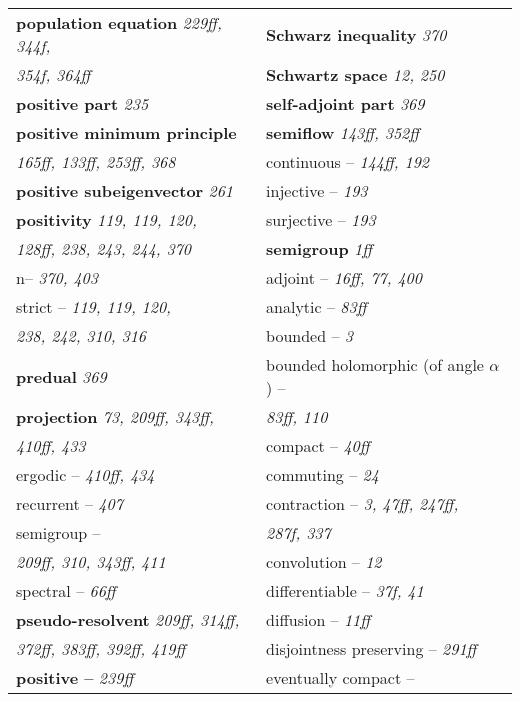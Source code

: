 \begin{longtable}{p{}p{}}
\textbf{population equation} \textit{229ff, 344f,} & \textbf{Schwarz inequality} \textit{370} \\
\quad \textit{354f, 364ff} & \textbf{Schwartz space} \textit{12, 250} \\
\textbf{positive part} \textit{235} & \textbf{self-adjoint part} \textit{369} \\
\textbf{positive minimum principle} & \textbf{semiflow} \textit{143ff, 352ff} \\
\quad \textit{165ff, 133ff, 253ff, 368} & \quad continuous -- \textit{144ff, 192} \\
\textbf{positive subeigenvector} \textit{261} & \quad injective -- \textit{193} \\
\textbf{positivity} \textit{119, 119, 120,} & \quad surjective -- \textit{193} \\
\quad \textit{128ff, 238, 243, 244, 370} & \textbf{semigroup} \textit{1ff} \\
\quad n-- \textit{370, 403} & \quad adjoint -- \textit{16ff, 77, 400} \\
\quad strict -- \textit{119, 119, 120,} & \quad analytic -- \textit{83ff} \\
\quad\quad \textit{238, 242, 310, 316} & \quad bounded -- \textit{3} \\
\textbf{predual} \textit{369} & \quad bounded holomorphic (of angle $ \alpha $) -- \\
\textbf{projection} \textit{73, 209ff, 343ff,} & \quad\quad \textit{83ff, 110} \\
\quad \textit{410ff, 433} & \quad compact -- \textit{40ff} \\
\quad ergodic -- \textit{410ff, 434} & \quad commuting -- \textit{24} \\
\quad recurrent -- \textit{407} & \quad contraction -- \textit{3, 47ff, 247ff,} \\
\quad semigroup -- & \quad\quad \textit{287f, 337} \\
\quad\quad \textit{209ff, 310, 343ff, 411} & \quad convolution -- \textit{12} \\
\quad spectral -- \textit{66ff} & \quad differentiable -- \textit{37f, 41} \\
\textbf{pseudo-resolvent} \textit{209ff, 314ff,} & \quad diffusion -- \textit{11ff} \\
\quad \textit{372ff, 383ff, 392ff, 419ff} & \quad disjointness preserving -- \textit{291ff} \\
\textbf{positive --} \textit{239ff} & \quad eventually compact -- \\

\end{longtable}
